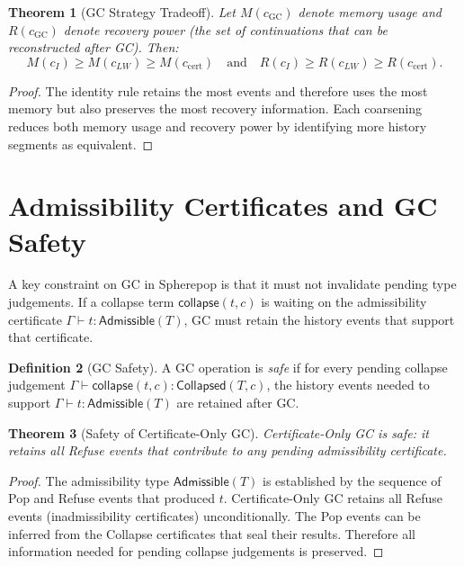 \documentclass[12pt, a4paper, openany]{book}
\theoremstyle{plain}
\newtheorem{theorem}{Theorem}[chapter]
\theoremstyle{definition}
\newtheorem{definition}[theorem]{Definition}
\theoremstyle{remark}
\newcommand{\Adm}{\mathsf{Admissible}}
\newcommand{\Col}{\mathsf{Collapsed}}
\begin{document}
\begin{theorem}[GC Strategy Tradeoff]
Let $M(c_{\mathrm{GC}})$ denote memory usage and $R(c_{\mathrm{GC}})$ denote
recovery power (the set of continuations that can be reconstructed after GC).
Then:
\[
M(c_I) \geq M(c_{LW}) \geq M(c_{\mathrm{cert}})
\quad \text{and} \quad
R(c_I) \geq R(c_{LW}) \geq R(c_{\mathrm{cert}}).
\]
\end{theorem}

\begin{proof}
The identity rule retains the most events and therefore uses the most memory but
also preserves the most recovery information. Each coarsening reduces both memory
usage and recovery power by identifying more history segments as equivalent.
\end{proof}

\section{Admissibility Certificates and GC Safety}

A key constraint on GC in Spherepop is that it must not invalidate pending type
judgements. If a collapse term $\mathsf{collapse}(t, c)$ is waiting on the
admissibility certificate $\Gamma \vdash t : \Adm(T)$, GC must retain the history
events that support that certificate.

\begin{definition}[GC Safety]
A GC operation is \emph{safe} if for every pending collapse judgement
$\Gamma \vdash \mathsf{collapse}(t, c) : \Col(T, c)$, the history events needed
to support $\Gamma \vdash t : \Adm(T)$ are retained after GC.
\end{definition}

\begin{theorem}[Safety of Certificate-Only GC]
Certificate-Only GC is safe: it retains all Refuse events that contribute to
any pending admissibility certificate.
\end{theorem}

\begin{proof}
The admissibility type $\Adm(T)$ is established by the sequence of Pop and Refuse
events that produced $t$. Certificate-Only GC retains all Refuse events
(inadmissibility certificates) unconditionally. The Pop events can be inferred
from the Collapse certificates that seal their results. Therefore all information
needed for pending collapse judgements is preserved.
\end{proof}
\end{document}
